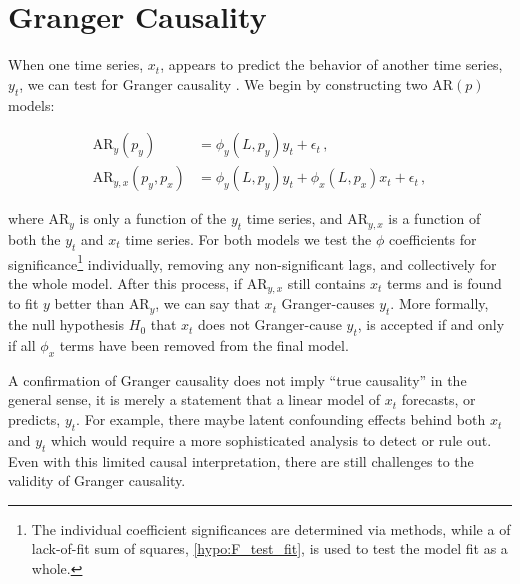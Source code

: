 \section{Granger Causality}
\label{time_series:granger_causality}

When one time series, $x_{t}$, appears to
predict the behavior of another time series, $y_{t}$,
we can test for Granger causality \cite{10.2307/1912791}.
We begin by constructing two $\text{AR}\left(p\right)$ models:

\begin{subequations}\label{eq:time_series:granger_causality}
\begin{align}
\text{AR}_{y}\left(p_{y}\right) &= \phi_{y}\left(L,p_{y}\right) y_{t} + \epsilon_{t}\,, \label{eq:time_series:granger_causality:y} \\
\text{AR}_{y,x}\left(p_{y}, p_{x}\right) &= \phi_{y}\left(L,p_{y}\right) y_{t} + \phi_{x}\left(L,p_{x}\right) x_{t} + \epsilon_{t}\,, \label{eq:time_series:granger_causality:yx}
\end{align}
\end{subequations}

\noindent where $\text{AR}_{y}$ is only a function of the $y_{t}$ time series,
and $\text{AR}_{y,x}$ is a function of both the $y_{t}$ and $x_{t}$ time series.
For both models we test the $\phi$ coefficients for significance\footnote{The
individual coefficient significances are determined via \ttest methods,
while a \Ftest of lack-of-fit sum of squares, \cref{hypo:F_test_fit},
is used to test the model fit as a whole.} individually,
removing any non-significant lags, and collectively for the whole model.
After this process, if $\text{AR}_{y,x}$ still contains $x_{t}$ terms
and is found to fit $y$ better than $\text{AR}_{y}$,
we can say that $x_{t}$ Granger-causes $y_{t}$.
More formally, the null hypothesis $H_{0}$ that $x_{t}$ does not Granger-cause $y_{t}$,
is accepted if and only if all $\phi_{x}$ terms have been removed from the final model.

A confirmation of Granger causality does not imply ``true causality'' in the general sense,
it is merely a statement that a linear model of $x_{t}$ forecasts, or predicts, $y_{t}$.
For example, there maybe latent confounding effects behind both $x_{t}$ and $y_{t}$
which would require a more sophisticated analysis to detect or rule out.
Even with this limited causal interpretation,
there are still challenges \cite{GRASSMANN2020} to the validity of Granger causality.


